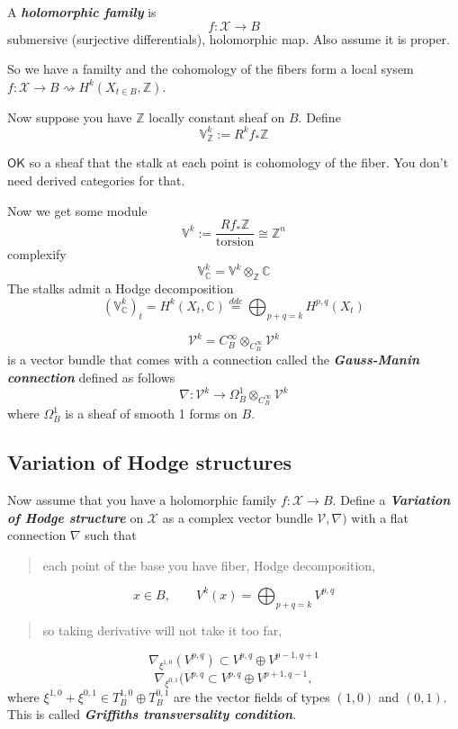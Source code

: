 \begin{defn}\leavevmode
	A \textit{\textbf{holomorphic family}} is
	 \[f:\mathcal{X}\to B\]
	 submersive (surjective differentials), holomorphic map. Also assume it is proper.
\end{defn}

So we have a familty and the cohomology of the fibers form a local sysem $f:\mathcal{X}\to  B\rightsquigarrow H^{k}(X_{t\in B},\mathbb{Z})$.

Now suppose you have $\mathbb{Z}$ locally constant sheaf on $B$. Define \[\mathbb{V}^k_\mathbb{Z}:=R^kf_*\mathbb{Z}\]

{\color{5}$\mathsf{OK}$ so a sheaf that the stalk at each point is cohomology of the fiber. You don't need derived categories for that.} 

Now we get some module
\[\mathbb{V}^k:=\dfrac{Rf_* \mathbb{Z}}{\text{torsion} }\cong \mathbb{Z}^n\]
complexify
\[\mathbb{V}^k_{\mathbb{C}}=\mathbb{V}^k\otimes_{\mathbb{Z}}\mathbb{C}\]
The stalks admit a Hodge decomposition
\[(\mathbb{V}^k_{\mathbb{C}})_t=H^{k}(X_t,\mathbb{C})\overset{ddc}{=}\bigoplus_{p+q=k} H^{p,q}(X_t) \]

\begin{defn}\leavevmode
	\[\mathcal{V}^k=C_B^\infty\otimes_{C^\infty_B}\mathcal{V}^k\]
	is a vector bundle that comes with a connection called the \textit{\textbf{Gauss-Manin connection}} defined as follows
	\[\nabla :\mathcal{V}^k\to \Omega^{1}_B \otimes_{C^\infty_B}\mathcal{V}^k\]
	where $\Omega^1_B$ is a sheaf of smooth 1 forms on $B$.
\end{defn}

\subsection{Variation of Hodge structures}

Now assume that you have a holomorphic family $f:\mathcal{X}\to B$. Define a  \textit{\textbf{Variation of Hodge structure}} on  $\mathcal{X}$ as a complex vector bundle $\mathcal{V},\nabla )$ with a flat connection $\nabla$ such that

{\color{4}\begin{quotation}
	each point of the base you have fiber, Hodge decomposition,
\end{quotation}}
\[x\in B, \qquad V^k(x)=\bigoplus_{p+q=k}V^{p,q}  \]
{\color{4}\begin{quotation}
	so taking derivative will not take it too far,
\end{quotation}}
\[\nabla_{\xi^{1,0}}(V^{p,q} )\subset V^{p,q} \oplus V^{p-1,q+1}\]
\[\nabla_{\xi^{0,1} }(V^{p,q} \subset V^{p,q}\oplus V^{p+1,q-1},\]
where $\xi^{1,0}+\xi^{0,1} \in T^{1,0}_B\oplus T^{0,1}_B$ are the vector fields of types $(1,0)$ and  $(0,1)$. This is called  \textit{\textbf{Griffiths transversality condition}}.

